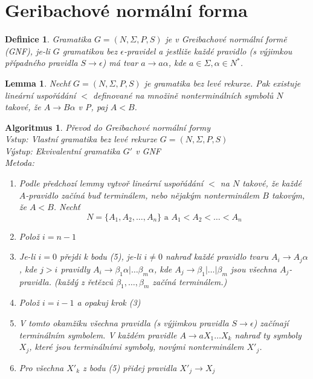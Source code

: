 \documentclass[a4paper, 11pt]{report}
\newtheorem{mydef}{Definice}[chapter]
\newtheorem{lemma}{Lemma}[chapter]
\newtheorem{alg}{Algoritmus}[chapter]
\begin{document}
\section{Geribachové normální forma}

\begin{mydef}
Gramatika $G = (N, \Sigma, P, S)$ je v Greibachové normální formě (GNF), je-li $G$ gramatikou bez $\epsilon$-pravidel a jestliže každé pravidlo (s výjimkou případného pravidla $S \to \epsilon$) má tvar $a \to a \alpha$, kde $a \in \Sigma, \alpha \in N^*$.
\end{mydef}

\begin{lemma}
Nechť $G = (N, \Sigma, P, S)$ je gramatika bez levé rekurze. Pak existuje lineární uspořádání $<$ definované na množině nonterminálních symbolů $N$ takové, že $A \to B\alpha$ v P, paj $A < B$.
\end{lemma}

\begin{alg}
Převod do Greibachové normální formy\\
Vstup: Vlastní gramatika bez levé rekurze $G = (N, \Sigma, P, S)$\\
Výstup: Ekvivalentní gramatika $G'$ v GNF\\
Metoda:
\begin{enumerate}
	\item Podle předchozí lemmy vytvoř lineární uspořádání $<$ na $N$ takové, že každé $A$-pravidlo začíná buď terminálem, nebo nějakým nonterminálem $B$ takovým, že $A < B$. Nechť
	$$N = \{A_1, A_2, \dots, A_n\} \text{ a } A_1 < A_2 < \dots < A_n$$
	\item Polož $i = n -1$
	\item Je-li $i = 0$ přejdi k bodu (5), je-li $i \not=0$ nahraď každé pravidlo tvaru $A_i \to A_j \alpha$, kde $j > i$ pravidly $A_i \to \beta_1 \alpha | \dots \beta_m \alpha$, kde $A_j \to \beta_1 | \dots | \beta_m$ jsou všechna $A_j$-pravidla. (každý z řetězců $\beta_1, \dots, \beta_m$ začíná terminálem.)
	\item Polož $i = i - 1$ a opakuj krok (3)
	\item V tomto okamžiku všechna pravidla (s výjimkou pravidla $S \to \epsilon$) začínají terminálním symbolem. V každém pravidle $A \to aX_1 \dots X_k$ nahraď ty symboly $X_j$, které jsou terminálními symboly, novými nonterminálem $X'_j$.
	\item Pro všechna $X'_k$ z bodu (5) přidej pravidla $X'_j \to X_j$
\end{enumerate}
\end{alg}
\end{document}
